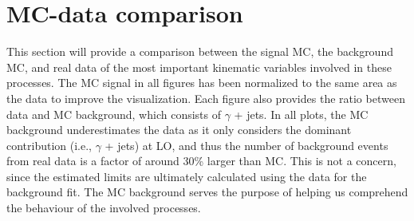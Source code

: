 \section{MC-data comparison}

This section will provide a comparison between the signal MC, the background MC, and real data of the most important kinematic variables involved in these processes. The MC signal in all figures has been normalized to the same area as the data to improve the visualization. Each figure also provides the ratio between data and MC background, which consists of $\gamma$ + jets. In all plots, the MC background underestimates the data as it only considers the dominant contribution (i.e., $\gamma$ + jets) at LO, and thus the number of background events from real data is a factor of around 30\% larger than MC. This is not a concern, since the estimated limits are ultimately calculated using the data for the background fit. The MC background serves the purpose of helping us comprehend the behaviour of the involved processes.

